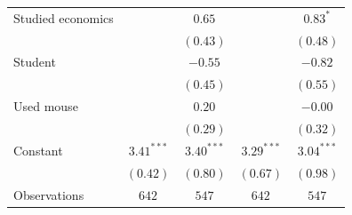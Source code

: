 \begin{tabular}{l c c c c}
Studied economics        &               & $0.65$        &               & $0.83^{*}$    \\
                         &               & $(0.43)$      &               & $(0.48)$      \\
Student                  &               & $-0.55$       &               & $-0.82$       \\
                         &               & $(0.45)$      &               & $(0.55)$      \\
Used mouse               &               & $0.20$        &               & $-0.00$       \\
                         &               & $(0.29)$      &               & $(0.32)$      \\
Constant                 & $3.41^{***}$  & $3.40^{***}$  & $3.29^{***}$  & $3.04^{***}$  \\
                         & $(0.42)$      & $(0.80)$      & $(0.67)$      & $(0.98)$      \\
\midrule
Observations                & $642$         & $547$         & $642$         & $547$         \\
\bottomrule
\end{tabular}
